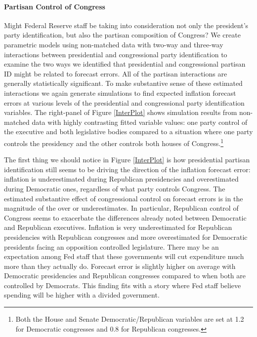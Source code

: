 \documentclass[a4paper]{article}\usepackage{graphicx, color}
\begin{document}
\paragraph{Partisan Control of Congress}

Might Federal Reserve staff be taking into consideration not only the president's party identification, but also the partisan composition of Congress?  We create parametric models using non-matched data with two-way and three-way interactions between presidential and congressional party identification to examine the two ways we identified that presidential and congressional partisan ID might be related to forecast errors. All of the partisan interactions are generally statistically significant. To make substantive sense of these estimated interactions we again generate simulations to find expected inflation forecast errors at various levels of the presidential and congressional party identification variables. The right-panel of Figure \ref{InterPlot} shows simulation results from non-matched data with highly contrasting fitted variable values: one party control of the executive and both legislative bodies compared to a situation where one party controls the presidency and the other controls both houses of Congress.\footnote{Both the House and Senate Democratic/Republican variables are set at 1.2 for Democratic congresses and 0.8 for Republican congresses.} 

The first thing we should notice in Figure \ref{InterPlot} is how presidential partisan identification still seems to be driving the direction of the inflation forecast error: inflation is underestimated during Republican presidencies and overestimated during Democratic ones, regardless of what party controls Congress. The estimated substantive effect of congressional control on forecast errors is in the magnitude of the over or underestimates. In particular, Republican control of Congress seems to exacerbate the differences already noted between Democratic and Republican executives. Inflation is very underestimated for Republican presidencies with Republican congresses and more overestimated for Democratic presidents facing an opposition controlled legislature. There may be an expectation among Fed staff that these governments will cut expenditure much more than they actually do. Forecast error is slightly higher on average with Democratic presidencies and Republican congresses compared to when both are controlled by Democrats. This finding fits with a story where Fed staff believe spending will be higher with a divided government. 
\end{document}
